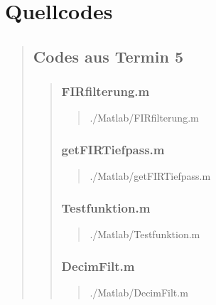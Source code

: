 

\section{Quellcodes}
\begin{quote}

	\subsection{Codes aus Termin 5}
	\begin{quote}
	    \subsubsection{FIRfilterung.m}
	    \begin{quote}
	        
	            {./Matlab/FIRfilterung.m}
	    \end{quote}
	    
	    \subsubsection{getFIRTiefpass.m}
	    \begin{quote}
	        
	            {./Matlab/getFIRTiefpass.m}
	    \end{quote}

        \subsubsection{Testfunktion.m}
        \begin{quote}
            
                {./Matlab/Testfunktion.m}
        \end{quote}
	    
	    \subsubsection{DecimFilt.m}
	    \begin{quote}
	        
	            {./Matlab/DecimFilt.m}
	    \end{quote}
	    
	\end{quote}
\end{quote}

